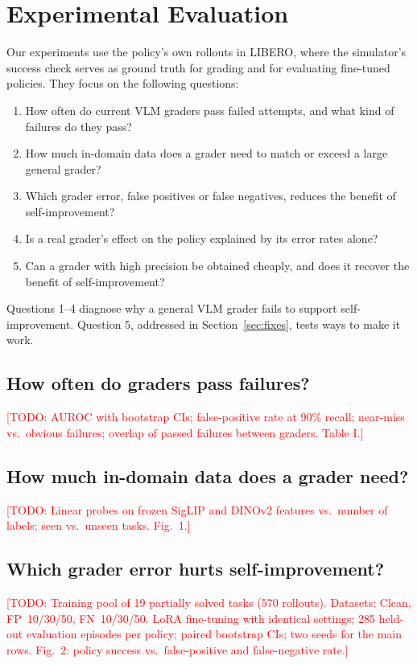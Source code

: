 \documentclass[letterpaper, journal, twoside]{IEEEtran}
\newcommand{\todo}[1]{\textcolor{red}{[TODO: #1]}}
\begin{document}
\section{Experimental Evaluation}

Our experiments use the policy's own rollouts in LIBERO, where the simulator's success check serves as ground truth
for grading and for evaluating fine-tuned policies. They focus on the following questions:
\begin{enumerate}
  \item How often do current VLM graders pass failed attempts, and what kind of failures do they pass?
  \item How much in-domain data does a grader need to match or exceed a large general grader?
  \item Which grader error, false positives or false negatives, reduces the benefit of self-improvement?
  \item Is a real grader's effect on the policy explained by its error rates alone?
  \item Can a grader with high precision be obtained cheaply, and does it recover the benefit of self-improvement?
\end{enumerate}
Questions 1--4 diagnose why a general VLM grader fails to support self-improvement. Question 5, addressed in
Section~\ref{sec:fixes}, tests ways to make it work.

\subsection{How often do graders pass failures?}
\todo{AUROC with bootstrap CIs; false-positive rate at 90\% recall; near-miss vs.\ obvious failures; overlap of passed
failures between graders. Table I.}

\subsection{How much in-domain data does a grader need?}
\todo{Linear probes on frozen SigLIP and DINOv2 features vs.\ number of labels; seen vs.\ unseen tasks. Fig.~1.}

\subsection{Which grader error hurts self-improvement?}
\todo{Training pool of 19 partially solved tasks (570 rollouts). Datasets: Clean, FP~10/30/50, FN~10/30/50. LoRA
fine-tuning with identical settings; 285 held-out evaluation episodes per policy; paired bootstrap CIs; two seeds for
the main rows. Fig.~2: policy success vs.\ false-positive and false-negative rate.}
\end{document}
